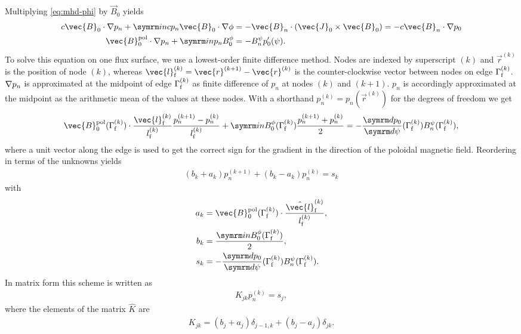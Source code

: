 Multiplying \cref{eq:mhd-phi} by $\vec{B}_{0}$ yields
\begin{align}
  c \vec{B}_{0} \cdot \grad p_{n} + \im n c p_{n} \vec{B}_{0} \cdot \grad \phi &= -\vec{B}_{n} \cdot (\vec{J}_{0} \times \vec{B}_{0}) = -c \vec{B}_{n} \cdot \grad p_{0} \nonumber \\
  \vec{B}_{0}^{\pol} \cdot \grad p_{n} + \im n p_{n} B_{0}^{\phi} &= -B_{n}^{\psi} p_{0}'(\psi). \label{eq:pn}
\end{align}
To solve this equation on one flux surface, we use a lowest-order finite difference method. Nodes are indexed by superscript $(k)$ and $\vec{r}^{(k)}$ is the position of node $(k)$, whereas $\vec{l}_{\fs}^{(k)} = \vec{r}^{(k+1)} - \vec{r}^{(k)}$ is the counter-clockwise vector between nodes on edge $\Gamma_{\textrm{f}}^{(k)}$. $\nabla p_{n}$ is approximated at the midpoint of edge $\Gamma_{\textrm{f}}^{(k)}$ as finite difference of $p_{n}$ at nodes $(k)$ and $(k+1)$. $p_{n}$ is accordingly approximated at the midpoint as the arithmetic mean of the values at these nodes. With a shorthand $p_{n}^{(k)} = p_{n} (\vec{r}^{(k)})$ for the degrees of freedom we get
\begin{gather}
  \vec{B}_{0}^{\pol} (\Gamma_{\fs}^{(k)}) \cdot \frac{\vec{l}_{\fs}^{(k)}}{l_{\fs}^{(k)}} \frac{p_{n}^{(k+1)} - p_{n}^{(k)}}{l_{\fs}^{(k)}} + \im n B_{0}^{\phi} (\Gamma_{\fs}^{(k)}) \frac{p_{n}^{(k+1)} + p_{n}^{(k)}}{2} = -\td[p_{0}]{\psi} (\Gamma_{\fs}^{(k)}) B_{n}^{\psi} (\Gamma_{\fs}^{(k)}),
\end{gather}
where a unit vector along the edge is used to get the correct sign for the gradient in the direction of the poloidal magnetic field. Reordering in terms of the unknowns yields
\begin{gather}
  (b_{k} + a_{k}) p_{n}^{(k+1)} + (b_{k} - a_{k}) p_{n}^{(k)} = s_{k}
\end{gather}
with
\begin{align}
  a_{k} &= \vec{B}_{0}^{\pol} (\Gamma_{\fs}^{(k)}) \cdot \frac{\hat{\vec{l}}_{\fs}^{(k)}}{l_{\fs}^{(k)}}, \\
  b_{k} &= \frac{\im n B_{0}^{\phi} (\Gamma_{\fs}^{(k)})}{2}, \\
  s_{k} &= -\td[p_{0}]{\psi} (\Gamma_{\fs}^{(k)}) B_{n}^{\psi} (\Gamma_{\fs}^{(k)}).
\end{align}
In matrix form this scheme is written as
\begin{gather}
  K_{jk} p_{n}^{(k)} = s_{j},
\end{gather}
where the elements of the matrix $\hat{K}$ are
\begin{gather}
  K_{jk} = (b_{j} + a_{j}) \delta_{j-1, k} + (b_{j} - a_{j}) \delta_{jk}.
\end{gather}
